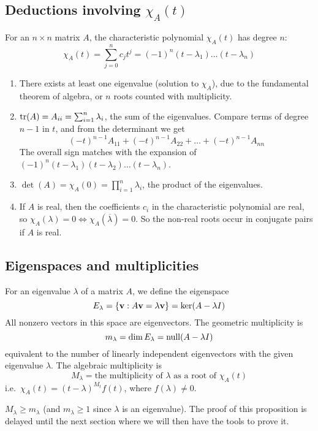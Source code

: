 \subsection{Deductions involving \(\chi_A(t)\)}
For an \(n \times n\) matrix \(A\), the characteristic polynomial \(\chi_A(t)\) has degree \(n\):
\[
	\chi_A(t) = \sum_{j = 0}^n c_j t^j = (-1)^n(t-\lambda_1)\dots(t-\lambda_n)
\]
\begin{enumerate}
	\item There exists at least one eigenvalue (solution to \(\chi_A\)), due to the fundamental theorem of algebra, or \(n\) roots counted with multiplicity.
	\item \(\tr(A) = A_{ii} = \sum_{i=1}^n \lambda_i\), the sum of the eigenvalues.
	      Compare terms of degree \(n-1\) in \(t\), and from the determinant we get
	      \[
		      (-t)^{n-1}A_{11} + (-t)^{n-1}A_{22} + \dots + (-t)^{n-1}A_{nn}
	      \]
	      The overall sign matches with the expansion of \((-1)^n(t-\lambda_1)(t-\lambda_2)\dots(t-\lambda_n)\).
	\item \(\det(A) = \chi_A(0) = \prod_{i=1}^n \lambda_i\), the product of the eigenvalues.
	\item If \(A\) is real, then the coefficients \(c_i\) in the characteristic polynomial are real, so \(\chi_A(\lambda) = 0 \iff \chi_A(\overline\lambda) = 0\).
	      So the non-real roots occur in conjugate pairs if \(A\) is real.
\end{enumerate}

\subsection{Eigenspaces and multiplicities}
For an eigenvalue \(\lambda\) of a matrix \(A\), we define the eigenspace
\[
	E_\lambda = \{ \vb v : A \vb v = \lambda \vb v \} = \ker (A - \lambda I)
\]
All nonzero vectors in this space are eigenvectors.
The geometric multiplicity is
\[
	m_\lambda = \dim E_\lambda = \operatorname{null} (A - \lambda I)
\]
equivalent to the number of linearly independent eigenvectors with the given eigenvalue \(\lambda\).
The algebraic multiplicity is
\[
	M_\lambda = \text{the multiplicity of } \lambda \text{ as a root of } \chi_A(t)
\]
i.e.\ \(\chi_A(t) = (t - \lambda)^{M_t} f(t)\), where \(f(\lambda) \neq 0\).

\begin{proposition}
	\(M_\lambda \geq m_\lambda\) (and \(m_\lambda \geq 1\) since \(\lambda\) is an eigenvalue).
	The proof of this proposition is delayed until the next section where we will then have the tools to prove it.
\end{proposition}

